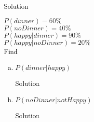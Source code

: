 \documentclass{article}
\begin{document}
\begin{spacing}{1.1}
\begin{homeworkProblem}
\begin{enumerate}[(a)]
\begin{homeworkSection}{Solution}
			\end{homeworkSection}				
	\end{enumerate}			
\end{homeworkProblem}	
\begin{homeworkProblem}
	$P( dinner) = 60\%$
	\\$P( noDinner) = 40\%$
	\\$P( happy | dinner) = 90\%$
	\\$P( happy | noDinner) = 20\%$
	\\Find
	\begin{enumerate}[(a)]
		\item $P( dinner | happy)$
			\begin{homeworkSection}{Solution}

			\end{homeworkSection}	
		\item $P( noDinner | notHappy)$
			\begin{homeworkSection}{Solution}


\end{homeworkSection}
\end{enumerate}
\end{homeworkProblem}
\end{spacing}
\end{document}
